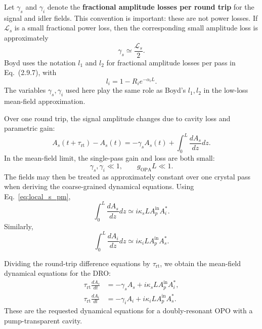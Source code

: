 \begin{resolucao}[Solution]
    Let $\gamma_s$ and $\gamma_i$ denote the \textbf{fractional amplitude losses per round trip} for the signal and idler fields. This convention is important: these are not power losses. If $\mathcal{L}_s$ is a small fractional power loss, then the corresponding small amplitude loss is approximately
    \begin{equation}
        \gamma_s\simeq \frac{\mathcal{L}_s}{2}.
    \end{equation}
    Boyd uses the notation $l_1$ and $l_2$ for fractional amplitude losses per pass in Eq.~(2.9.7), with
    \[
        l_i=1-R_ie^{-\alpha_iL}.
    \]
    The variables $\gamma_s,\gamma_i$ used here play the same role as Boyd's $l_1,l_2$ in the low-loss mean-field approximation.

    Over one round trip, the signal amplitude changes due to cavity loss and parametric gain:
    \begin{equation}
        A_s(t+\tau_{\mathrm{rt}})-A_s(t)
        =
        -\gamma_sA_s(t)
        +
        \int_0^{L}
        \frac{dA_s}{dz}dz.
        \label{eq:discrete_signal}
    \end{equation}
    In the mean-field limit, the single-pass gain and loss are both small:
    \begin{equation}
        \gamma_s,\gamma_i\ll1,
        \qquad
        g_{\mathrm{OPA}}L\ll1.
    \end{equation}
    The fields may then be treated as approximately constant over one crystal pass when deriving the coarse-grained dynamical equations. Using Eq.~\eqref{eq:local_s_pm},
    \begin{equation}
        \int_0^{L}
        \frac{dA_s}{dz}dz
        \simeq
        i\kappa_s L A_p^{\mathrm{in}}A_i^*.
    \end{equation}
    Similarly,
    \begin{equation}
        \int_0^{L}
        \frac{dA_i}{dz}dz
        \simeq
        i\kappa_i L A_p^{\mathrm{in}}A_s^*.
    \end{equation}

    Dividing the round-trip difference equations by $\tau_{\mathrm{rt}}$, we obtain the mean-field dynamical equations for the DRO:
    \begin{align}
        \tau_{\mathrm{rt}}
        \frac{dA_s}{dt}
        &=
        -\gamma_sA_s
        +
        i\kappa_sL A_p^{\mathrm{in}}A_i^*,
        \label{eq:dro_dyn_s_kappa}
        \\
        \tau_{\mathrm{rt}}
        \frac{dA_i}{dt}
        &=
        -\gamma_iA_i
        +
        i\kappa_iL A_p^{\mathrm{in}}A_s^*.
        \label{eq:dro_dyn_i_kappa}
    \end{align}
    These are the requested dynamical equations for a doubly-resonant OPO with a pump-transparent cavity.


\end{resolucao}
